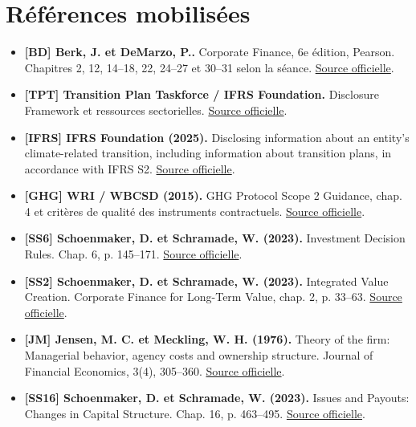 \documentclass[12pt,a4paper]{article}
\begin{document}
\section*{Références mobilisées}
\small
\begin{itemize}
\item \textbf{[BD] Berk, J. et DeMarzo, P..} Corporate Finance, 6e édition, Pearson. Chapitres 2, 12, 14--18, 22, 24--27 et 30--31 selon la séance. \href{https://www.pearson.com/en-us/subject-catalog/p/corporate-finance/P200000009791/9780137844906}{Source officielle}.
\item \textbf{[TPT] Transition Plan Taskforce / IFRS Foundation.} Disclosure Framework et ressources sectorielles. \href{https://www.ifrs.org/sustainability/knowledge-hub/transition-plan-taskforce-resources/}{Source officielle}.
\item \textbf{[IFRS] IFRS Foundation (2025).} Disclosing information about an entity’s climate-related transition, including information about transition plans, in accordance with IFRS S2. \href{https://www.ifrs.org/content/dam/ifrs/supporting-implementation/ifrs-s2/transition-plan-disclosure-s2.pdf}{Source officielle}.
\item \textbf{[GHG] WRI / WBCSD (2015).} GHG Protocol Scope 2 Guidance, chap. 4 et critères de qualité des instruments contractuels. \href{https://ghgprotocol.org/sites/default/files/2023-03/Scope\%202\%20Guidance.pdf}{Source officielle}.
\item \textbf{[SS6] Schoenmaker, D. et Schramade, W. (2023).} Investment Decision Rules. Chap. 6, p. 145--171. \href{https://doi.org/10.1007/978-3-031-35009-2_6}{Source officielle}.
\item \textbf{[SS2] Schoenmaker, D. et Schramade, W. (2023).} Integrated Value Creation. Corporate Finance for Long-Term Value, chap. 2, p. 33--63. \href{https://doi.org/10.1007/978-3-031-35009-2_2}{Source officielle}.
\item \textbf{[JM] Jensen, M. C. et Meckling, W. H. (1976).} Theory of the firm: Managerial behavior, agency costs and ownership structure. Journal of Financial Economics, 3(4), 305--360. \href{https://doi.org/10.1016/0304-405X(76)90026-X}{Source officielle}.
\item \textbf{[SS16] Schoenmaker, D. et Schramade, W. (2023).} Issues and Payouts: Changes in Capital Structure. Chap. 16, p. 463--495. \href{https://doi.org/10.1007/978-3-031-35009-2_16}{Source officielle}.
\end{itemize}\normalsize
\end{document}
